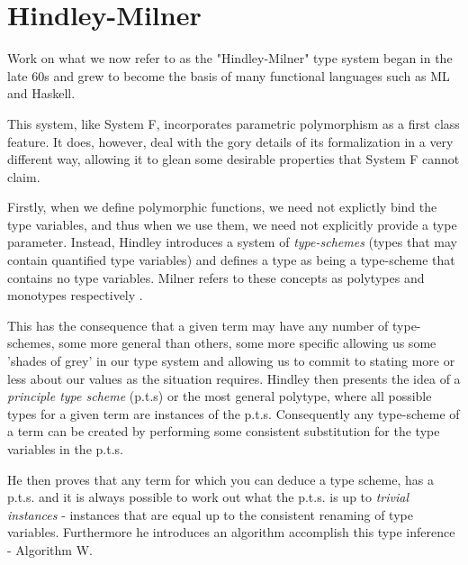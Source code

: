\documentclass{ProgressReport}[2020/09/15]
\begin{document}
          \section{Hindley-Milner}

            Work on what we now refer to as the "Hindley-Milner" type system began
            in the late 60s and grew to become the basis of many functional
            languages such as ML and Haskell.
            
            This system, like System F, incorporates parametric polymorphism as a
            first class feature. It does, however, deal with the gory details of
            its formalization in a very different way, allowing it to glean some
            desirable properties that System F cannot claim.
            
            Firstly, when we define polymorphic functions, we need not explictly
            bind the type variables, and thus when we use them, we need not
            explicitly provide a type parameter. Instead, Hindley introduces a
            system of \textit{type-schemes} \cite{hindley1969} (types
            that may contain quantified type variables) and defines a
            type as being a type-scheme that contains no type
            variables. Milner refers to these concepts as polytypes
            and monotypes respectively \cite{milner1978}.
            
            This has the consequence that a given term may have any number of
            type-schemes, some more general than others, some more specific
            allowing us some 'shades of grey' in our type system and allowing us
            to commit to stating more or less about our values as the situation
            requires. Hindley then presents the idea of a \textit{principle type
              scheme} (p.t.s) or the most general polytype, where all possible
            types for a given term are instances of the p.t.s. Consequently any
            type-scheme of a term can be created by performing some consistent
            substitution for the type variables in the p.t.s. 
            
            He then proves that any term for which you can deduce a type scheme,
            has a p.t.s. and it is always possible to work out what the p.t.s. is
            up to \textit{trivial instances} - instances that are equal up to the
            consistent renaming of type variables. Furthermore he
            introduces an algorithm accomplish this type inference -
            Algorithm W.
            
\end{document}
